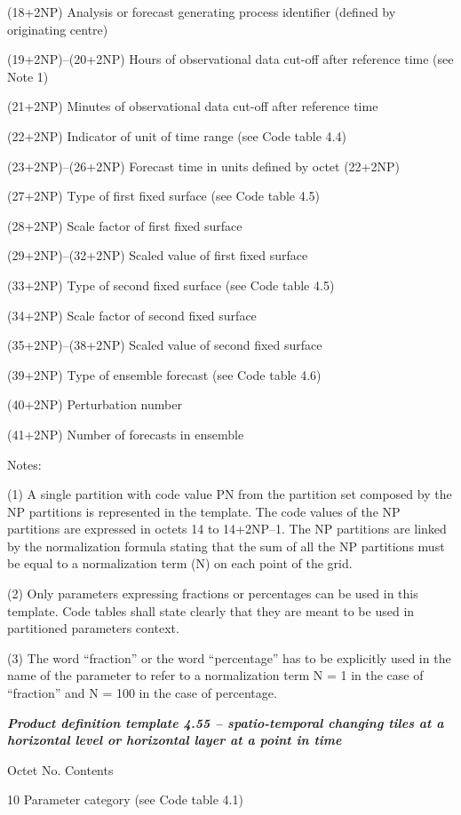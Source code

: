 (18+2NP) Analysis or forecast generating process identifier (defined by originating centre)

(19+2NP)--(20+2NP) Hours of observational data cut-off after reference time (see Note 1)

(21+2NP) Minutes of observational data cut-off after reference time

(22+2NP) Indicator of unit of time range (see Code table 4.4)

(23+2NP)--(26+2NP) Forecast time in units defined by octet (22+2NP)

(27+2NP) Type of first fixed surface (see Code table 4.5)

(28+2NP) Scale factor of first fixed surface

(29+2NP)--(32+2NP) Scaled value of first fixed surface

(33+2NP) Type of second fixed surface (see Code table 4.5)

(34+2NP) Scale factor of second fixed surface

(35+2NP)--(38+2NP) Scaled value of second fixed surface

(39+2NP) Type of ensemble forecast (see Code table 4.6)

(40+2NP) Perturbation number

(41+2NP) Number of forecasts in ensemble

Notes:

(1) A single partition with code value PN from the partition set composed by the NP partitions is represented in the template. The code values of the NP partitions are expressed in octets 14 to 14+2NP--1. The NP partitions are linked by the normalization formula stating that the sum of all the NP partitions must be equal to a normalization term (N) on each point of the grid.

(2) Only parameters expressing fractions or percentages can be used in this template. Code tables shall state clearly that they are meant to be used in partitioned parameters context.

(3) The word ``fraction'' or the word ``percentage'' has to be explicitly used in the name of the parameter to refer to a normalization term N = 1 in the case of ``fraction'' and N = 100 in the case of percentage.

\emph{\textbf{Product definition template 4.55 -- spatio-temporal changing tiles at a horizontal level or horizontal layer at a point in time}}

Octet No. Contents

10 Parameter category (see Code table 4.1)

